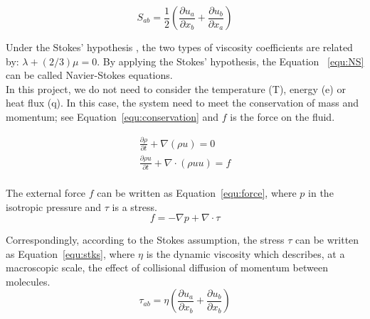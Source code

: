 \begin{equation}
    \label{equ:DCT}
        S_{a b} = \frac{1}{2} (\frac{\partial u_a}{\partial x_b} + \frac{\partial u_b}{\partial x_a})
\end{equation}

Under the Stokes' hypothesis \cite{gad1995stokes}, the two types of viscosity coefficients are related by: $\lambda + (2/3)\mu = 0$. By applying the Stokes' hypothesis, the Equation ~\ref{equ:NS} can be called Navier-Stokes equations. \\

In this project, we do not need to consider the temperature (T), energy (e) or heat flux (q). In this case, the system need to meet the conservation of mass and momentum; see Equation~\ref{equ:conservation} and $f$ is the force on the fluid. 

\begin{equation}
    \label{equ:conservation}
        \begin{matrix}
        \frac{\partial \rho}{ \partial t} + \nabla (\rho u) = 0 \\
        \frac{\partial{\rho u}}{\partial t} + \nabla \cdot (\rho u u ) = f \\
        \end{matrix}
\end{equation}

The external force $f$ can be written as Equation~\ref{equ:force}, where $p$ in the isotropic pressure and $\tau$ is a stress.
\begin{equation}
    \label{equ:force}
    f = -\nabla p + \nabla \cdot \tau
\end{equation}

Correspondingly, according to the Stokes assumption, the stress $\tau$ can be written as Equation~\ref{equ:stks}, where $\eta$ is the dynamic viscosity which describes, at a macroscopic
scale, the effect of collisional diffusion of momentum between molecules. 
\begin{equation}
    \label{equ:stks}
    \tau_{ab} = \eta (\frac{\partial u_a}{ \partial x_b} + \frac{\partial u_b}{\partial x_b})
\end{equation}


